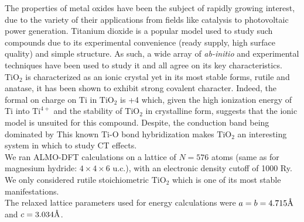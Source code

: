 \documentclass[aps,prb,twocolumn,amsmath,amssymb,superscriptaddress,longbibliography]{revtex4-1}
\newcommand{\angstrom}{\text{\normalfont\AA}}
\begin{document}
The properties of metal oxides have been the subject of rapidly growing interest, due to the variety of their applications from fields like catalysis to photovoltaic power generation. 
Titanium dioxide is a popular model used to study such compounds due to its experimental convenience (ready supply, high surface quality) and simple structure.
As such, a wide array of \emph{ab-initio} and experimental techniques have been used to study it and all agree on its key characteristics.
$\text{TiO}_{2}$ is characterized as an ionic crystal yet in its most stable forms, rutile and anatase, it has been shown to exhibit strong covalent character\cite{}.
Indeed, the formal on charge on Ti in $\text{TiO}_{2}$ is +4 which, given the high ionization energy of Ti into $\text{Ti}^{4+}$ and the stability of $\text{TiO}_{2}$ in crystalline form, suggests that the ionic model is unsuited for this compound.
Despite, the conduction band being dominated by 
This known Ti-O bond hybridization makes $\text{TiO}_{2}$ an interesting system in which to study CT effects. \\

We ran ALMO-DFT calculations on a lattice of $N = 576$ atoms (same as for magnesium hydride: $4\times 4\times 6$ u.c.), with an electronic density cutoff of 1000 Ry. We only considered rutile stoichiometric $\text{TiO}_{2}$ which is one of its most stable manifestations.\\
The relaxed lattice parameters used for energy calculations were $a = b = 4.715\angstrom$ and $c = 3.034\angstrom$.\\
\end{document}
